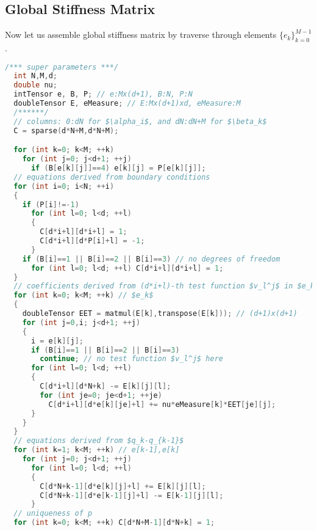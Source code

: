 \subsection{Global Stiffness Matrix}
Now let us assemble global stiffness matrix by traverse through elements $\{e_k\}_{k=0}^{M-1}$.
\begin{lstlisting}[caption=GlobalStiffnessMatrix,
language=C++,keywordstyle=\color{blue},commentstyle=\color{red!80!green!80!blue!80},frame=lines,
rulesepcolor=\color{red!50!green!50!blue!50},tabsize=2,mathescape=true]
  /*** super parameters ***/
  int N,M,d; 
  double nu;
  intTensor e, B, P; // e:Mx(d+1), B:N, P:N
  doubleTensor E, eMeasure; // E:Mx(d+1)xd, eMeasure:M
  /******/
  // columns: 0:dN for $\alpha_i$, and dN:dN+M for $\beta_k$
  C = sparse(d*N+M,d*N+M); 

  for (int k=0; k<M; ++k) 
    for (int j=0; j<d+1; ++j)
      if (B[e[k][j]]==4) e[k][j] = P[e[k][j]];
  // equations derived from boundary conditions
  for (int i=0; i<N; ++i)
  {
    if (P[i]!=-1) 
      for (int l=0; l<d; ++l)
      {
        C[d*i+l][d*i+l] = 1;
        C[d*i+l][d*P[i]+l] = -1;
      }
    if (B[i]==1 || B[i]==2 || B[i]==3) // no degrees of freedom
      for (int l=0; l<d; ++l) C[d*i+l][d*i+l] = 1;
  }
  // coefficients derived from (d*i+l)-th test function $v_l^j$ in $e_k,i=e_k^j$
  for (int k=0; k<M; ++k) // $e_k$
  {
    doubleTensor EET = matmul(E[k],transpose(E[k])); // (d+1)x(d+1)
    for (int j=0,i; j<d+1; ++j)
    {
      i = e[k][j]; 
      if (B[i]==1 || B[i]==2 || B[i]==3)
        continue; // no test function $v_l^j$ here
      for (int l=0; l<d; ++l)
      {
        C[d*i+l][d*N+k] -= E[k][j][l];
        for (int je=0; je<d+1; ++je)
          C[d*i+l][d*e[k][je]+l] += nu*eMeasure[k]*EET[je][j];
      }
    }
  }
  // equations derived from $q_k-q_{k-1}$
  for (int k=1; k<M; ++k) // e[k-1],e[k]
    for (int j=0; j<d+1; ++j)
      for (int l=0; l<d; ++l)
      {
        C[d*N+k-1][d*e[k][j]+l] += E[k][j][l];
        C[d*N+k-1][d*e[k-1][j]+l] -= E[k-1][j][l];
      }
  // uniqueness of p
  for (int k=0; k<M; ++k) C[d*N+M-1][d*N+k] = 1;
\end{lstlisting}
